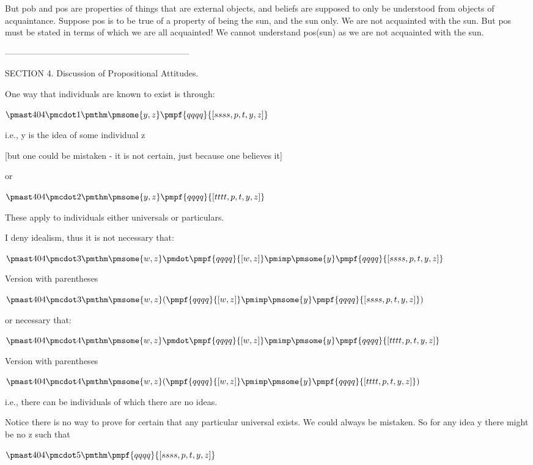 \documentclass[12pt]{article}
\begin{document}
But pob and pos are properties of things that are external objects, and beliefs are supposed to only be understood from objects of acquaintance. Suppose pos is to be true of a property of being the sun, and the sun only. We are not acquainted with the sun. But pos must be stated in terms of which we are all acquainted! We cannot understand pos(sun) as we are not acquainted with the sun.

-----------------------------------------------------------------

SECTION 4. Discussion of Propositional Attitudes.

One way that individuals are known to exist is through:

$\pmast 404 \pmcdot 1 \pmthm \pmsome{y,z} \pmpf{qqqq}{[ssss,p,t,y,z]}$

i.e., y is the idea of some individual z

[but one could be mistaken - it is not certain, just because one believes it]

or

$\pmast 404 \pmcdot 2 \pmthm \pmsome{y,z} \pmpf{qqqq}{[tttt,p,t,y,z]}$

These apply to individuals either universals or particulars.

I deny idealism, thus it is not necessary that:

$\pmast 404 \pmcdot 3 \pmthm \pmsome{w,z} \pmdot \pmpf{qqqq}{[w, z]} \pmimp \pmsome{y} \pmpf{qqqq}{[ssss,p,t,y,z]}$
 
 

Version with parentheses

$\pmast 404 \pmcdot 3 \pmthm \pmsome{w,z}  (  \pmpf{qqqq}{[w, z]} \pmimp \pmsome{y}\pmpf{qqqq}{[ssss,p,t,y,z]})$


or necessary that:

$\pmast 404 \pmcdot 4 \pmthm \pmsome{w,z} \pmdot \pmpf{qqqq}{[w, z]} \pmimp \pmsome{y} \pmpf{qqqq}{[tttt,p,t,y,z]}$
 
 

Version with parentheses

$\pmast 404 \pmcdot 4 \pmthm \pmsome{w,z}  (  \pmpf{qqqq}{[w, z]} \pmimp \pmsome{y}\pmpf{qqqq}{[tttt,p,t,y,z]})$


i.e., there can be individuals of which there are no ideas.

Notice there is no way to prove for certain that any particular universal exists. We could always be mistaken. So for any idea y there might be no z such that

$\pmast 404 \pmcdot 5 \pmthm \pmpf{qqqq}{[ssss, p,t,y, z]}$
\end{document}

